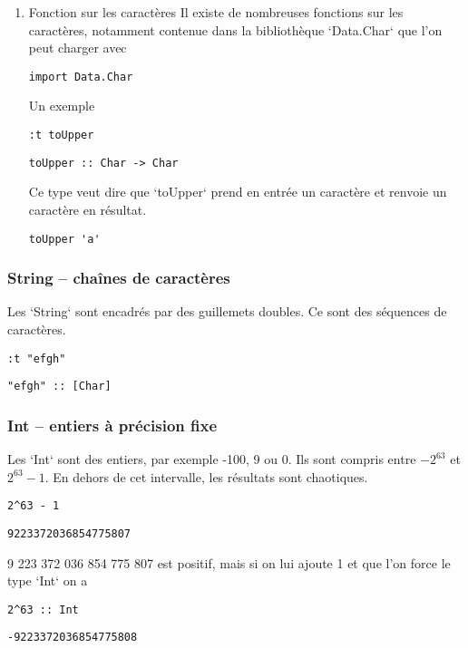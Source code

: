 \documentclass[11pt]{article}
\begin{document}
\begin{enumerate}
\item Fonction sur les caractères
\label{sec:org167eccf}
Il existe de nombreuses fonctions sur les caractères, notamment contenue dans la bibliothèque `Data.Char` que l'on peut charger avec
\begin{verbatim}
import Data.Char
\end{verbatim}
Un exemple 
\begin{verbatim}
:t toUpper
\end{verbatim}
\begin{verbatim}
toUpper :: Char -> Char
\end{verbatim}


Ce type veut dire que `toUpper` prend en entrée un caractère et renvoie un caractère en résultat.

\begin{verbatim}
toUpper 'a'
\end{verbatim}
\end{enumerate}

\subsubsection{String -- chaînes de caractères}
\label{sec:org0925caf}
Les `String` sont encadrés par des guillemets doubles.  Ce sont des séquences de caractères.
\begin{verbatim}
:t "efgh"
\end{verbatim}
\begin{verbatim}
"efgh" :: [Char]
\end{verbatim}

\subsubsection{Int --  entiers à précision fixe}
\label{sec:org190f90f}
Les `Int` sont des entiers, par exemple -100, 9 ou 0.    Ils sont compris entre \(-2^{63}\)  et \(2^{63}-1\).   En dehors de cet intervalle, les résultats sont chaotiques.

\begin{verbatim}
2^63 - 1
\end{verbatim}
\begin{verbatim}
9223372036854775807
\end{verbatim}


9 223 372 036 854 775 807 est positif, mais si on lui ajoute 1 et que l'on force le type `Int` on a
\begin{verbatim}
2^63 :: Int
\end{verbatim}
\begin{verbatim}
-9223372036854775808
\end{verbatim}
\end{document}
